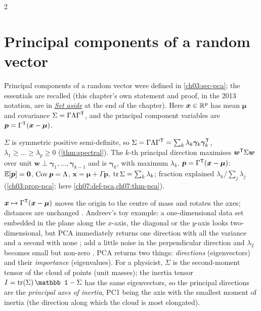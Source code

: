 \begin{paracol}{2}
\section{Principal components of a random vector}\label{ch07:sec-pop}

Principal components of a random vector were defined in \cref{ch03:sec-pca}; the essentials are recalled \inmargin{} (this chapter's own statement and proof, in the 2013 notation, are in \hyperref[ch07:sec-setaside]{\emph{Set aside}} at the end of the chapter). Here $\bm x\in\mathbb{R}^p$ has mean $\bm\mu$ and covariance $\Sigma=\Gamma\Lambda\Gamma^{\mathsf T}$, and the principal component variables are $\bm p=\Gamma^{\mathsf T}(\bm x-\bm\mu)$.
\begin{recall}
$\Sigma$ is symmetric positive semi-definite, so $\Sigma=\Gamma\Lambda\Gamma^{\mathsf T}=\sum_k\lambda_k\bm\gamma_k\bm\gamma_k^{\mathsf T}$, $\lambda_1\ge\dots\ge\lambda_p\ge0$ (\cref{thm:spectral}). The $k$-th principal direction maximises $\bm w^{\mathsf T}\Sigma\bm w$ over unit $\bm w\perp\bm\gamma_1,\dots,\bm\gamma_{k-1}$ and is $\bm\gamma_k$, with maximum $\lambda_k$. $\bm p=\Gamma^{\mathsf T}(\bm x-\bm\mu)$: $\mathbb{E}[\bm p]=\bm0$, $\operatorname{Cov}\bm p=\Lambda$, $\bm x=\bm\mu+\Gamma\bm p$, $\operatorname{tr}\Sigma=\sum_k\lambda_k$; fraction explained $\lambda_k/\sum_j\lambda_j$ (\cref{ch03:prop-pca}; here \cref{ch07:def-pca,ch07:thm-pca}).
\end{recall}

\begin{intuition}
$\bm x\mapsto\Gamma^{\mathsf T}(\bm x-\bm\mu)$ moves the origin to the centre of mass and rotates the axes; distances are
unchanged . Andreev's toy example: a one-dimensional data set embedded in the plane
along the $x$-axis, the diagonal or the $y$-axis looks two-dimensional, but PCA immediately returns one
direction with all the variance and a second with none ; add a little noise in the
perpendicular direction and $\lambda_2$ becomes small but non-zero . PCA returns two things:
\emph{directions} (eigenvectors) and their \emph{importance} (eigenvalues). For a physicist, $\Sigma$ is the
second-moment tensor of the cloud of points (unit masses); the inertia tensor $I=\tr(\Sigma)\,\mathbb 1-\Sigma$ has
the same eigenvectors, so the principal directions are the \emph{principal axes of inertia}, PC1 being the
axis with the smallest moment of inertia (the direction along which the cloud is most elongated).
\end{intuition}


\end{paracol}
